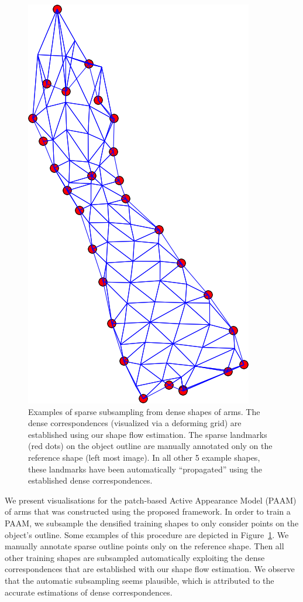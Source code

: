 \begin{figure}
        \includegraphics[height=\ofh]{resources/Annotation_Correction/Suplementory_Meterial/SparseSamples/mean-4}
    \caption{Examples of sparse subsampling from dense shapes of arms. The dense correspondences (visualized via a deforming grid) are established using our shape flow estimation. The sparse landmarks (red dots) on the object outline are manually annotated only on the reference shape (left most image). In all other 5 example shapes, these landmarks have been automatically ``propagated'' using the established dense correspondences.}
    \label{fig:sparsesample}
\end{figure}

We present visualisations for the patch-based Active Appearance Model (PAAM) of arms that was constructed using the proposed framework. In order to train a PAAM, we subsample the densified training shapes to only consider points on the object's outline. Some examples of this procedure are depicted in Figure~\ref{fig:sparsesample}. We manually annotate sparse outline points only on the reference shape. Then all other training shapes are subsampled automatically exploiting the dense correspondences that are established with our shape flow estimation. We observe that the automatic subsampling seems plausible, which is attributed to the accurate estimations of dense correspondences.


